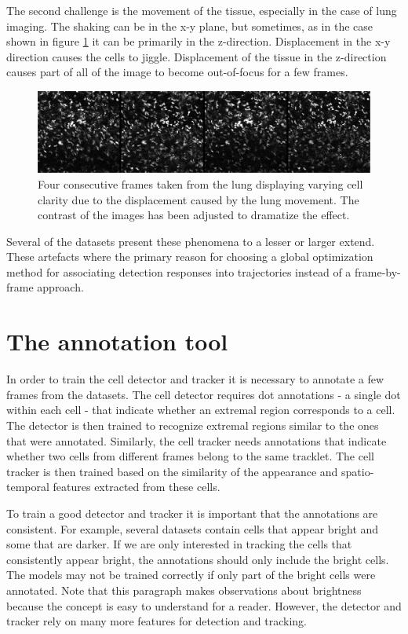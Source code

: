 	The second challenge is the movement of the tissue, especially in the case of lung imaging. The shaking can be in the x-y plane, but sometimes, as in the case shown in figure \cref{fig:data_challenges_movement} it can be primarily in the z-direction. Displacement in the x-y direction causes the cells to jiggle. Displacement of the tissue in the z-direction causes part of all of the image to become out-of-focus for a few frames.
	
	\begin{figure}[h]

		\includegraphics[width=\textwidth]{images/data_challenge_movement}

		\caption{Four consecutive frames taken from the lung displaying varying cell clarity due to the displacement caused by the lung movement. The contrast of the images has been adjusted to dramatize the effect.}
		\label{fig:data_challenges_movement}
	\end{figure}
	
	Several of the datasets present these phenomena to a lesser or larger extend. These artefacts where the primary reason for choosing a global optimization method for associating detection responses into trajectories instead of a frame-by-frame approach.

    \section{The annotation tool \statusfirstdraft}
    \label{sec:data_tool}
    	In order to train the cell detector and tracker it is necessary to annotate a few frames from the datasets. The cell detector requires dot annotations - a single dot within each cell - that indicate whether an extremal region corresponds to a cell. The detector is then trained to recognize extremal regions similar to the ones that were annotated. Similarly, the cell tracker needs annotations that indicate whether two cells from different frames belong to the same tracklet. The cell tracker is then trained based on the similarity of the appearance and spatio-temporal features extracted from these cells.
    	
    	To train a good detector and tracker it is important that the annotations are consistent. For example, several datasets contain cells that appear bright and some that are darker. If we are only interested in tracking the cells that consistently appear bright, the annotations should only include the bright cells. The models may not be trained correctly if only part of the bright cells were annotated. Note that this paragraph makes observations about brightness because the concept is easy to understand for a reader. However, the detector and tracker rely on many more features for detection and tracking.
	
